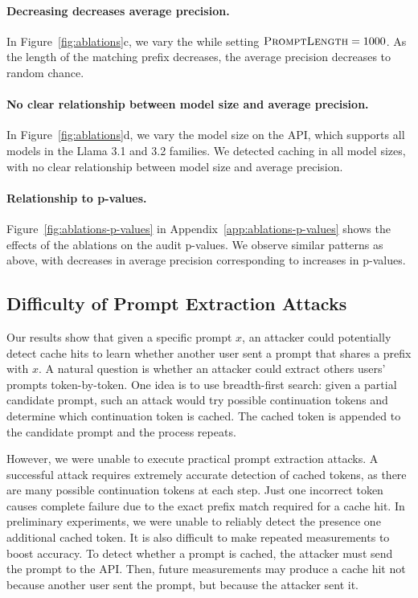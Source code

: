 \paragraph{Decreasing \PrefixFraction{} decreases average precision.} In Figure~\ref{fig:ablations}c, we vary the \PrefixFraction{} while setting $\textsc{PromptLength}{} = 1000$. As the length of the matching prefix decreases, the average precision decreases to random chance.

\paragraph{No clear relationship between model size and average precision.} In Figure~\ref{fig:ablations}d, we vary the model size on the \Fireworks{} API, which supports all models in the Llama 3.1 and 3.2 families. We detected caching in all model sizes, with no clear relationship between model size and average precision.

\paragraph{Relationship to p-values.} Figure~\ref{fig:ablations-p-values} in Appendix~\ref{app:ablations-p-values} shows the effects of the ablations on the audit p-values. We observe similar patterns as above, with decreases in average precision corresponding to increases in p-values.

\subsection{Difficulty of Prompt Extraction Attacks}

Our results show that given a specific prompt $x$, an attacker could potentially detect cache hits to learn whether another user sent a prompt that shares a prefix with $x$. A natural question is whether an attacker could extract others users' prompts token-by-token. One idea is to use breadth-first search: given a partial candidate prompt, such an attack would try possible continuation tokens and determine which continuation token is cached. The cached token is appended to the candidate prompt and the process repeats.


However, we were unable to execute practical prompt extraction attacks. A successful attack requires extremely accurate detection of cached tokens, as there are many possible continuation tokens at each step. Just one incorrect token causes complete failure due to the exact prefix match required for a cache hit. In preliminary experiments, we were unable to reliably detect the presence one additional cached token. It is also difficult to make repeated measurements to boost accuracy. To detect whether a prompt is cached, the attacker must send the prompt to the API. Then, future measurements may produce a cache hit not because another user sent the prompt, but because the attacker sent it.



